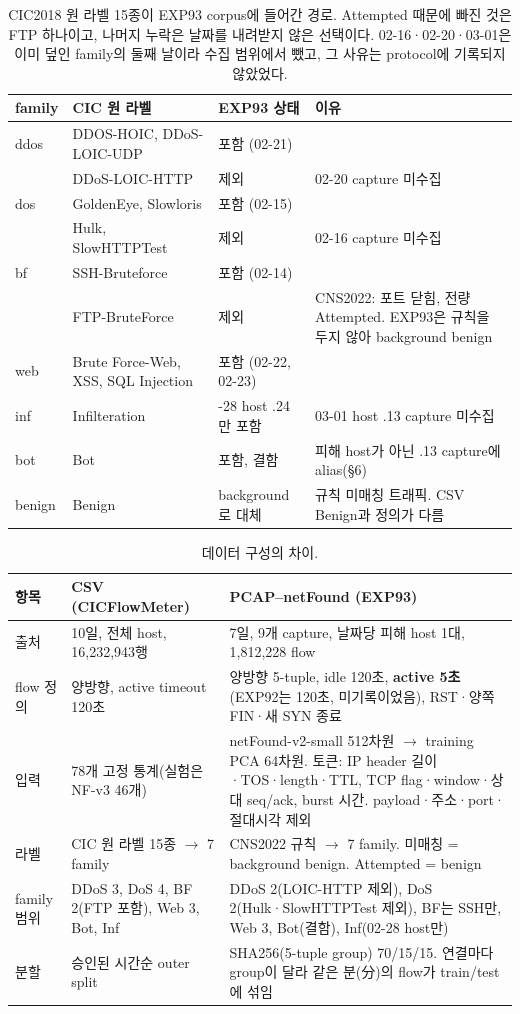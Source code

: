 \begin{table}[H]
\centering\small
\caption{CIC2018 원 라벨 15종이 EXP93 corpus에 들어간 경로. Attempted 때문에 빠진 것은 FTP 하나이고, 나머지 누락은 날짜를 내려받지 않은 선택이다. 02-16·02-20·03-01은 이미 덮인 family의 둘째 날이라 수집 범위에서 뺐고, 그 사유는 protocol에 기록되지 않았었다.}
\begin{tabularx}{\linewidth}{l>{\raggedright\arraybackslash}p{.3\linewidth}>{\raggedright\arraybackslash}p{.22\linewidth}Y}
\toprule family & CIC 원 라벨 & EXP93 상태 & 이유\\\midrule
ddos & DDOS-HOIC, DDoS-LOIC-UDP & 포함 (02-21) & \\
     & DDoS-LOIC-HTTP & 제외 & 02-20 capture 미수집\\
dos  & GoldenEye, Slowloris & 포함 (02-15) & \\
     & Hulk, SlowHTTPTest & 제외 & 02-16 capture 미수집\\
bf   & SSH-Bruteforce & 포함 (02-14) & \\
     & FTP-BruteForce & 제외 & CNS2022: 포트 닫힘, 전량 Attempted. EXP93은 규칙을 두지 않아 background benign\\
web  & Brute Force-Web, XSS, SQL Injection & 포함 (02-22, 02-23) & \\
inf  & Infilteration & 02-28 host .24만 포함 & 03-01 host .13 capture 미수집\\
bot  & Bot & 포함, 결함 & 피해 host가 아닌 .13 capture에 alias(\S6)\\
benign & Benign & background로 대체 & 규칙 미매칭 트래픽. CSV Benign과 정의가 다름\\
\bottomrule
\end{tabularx}
\end{table}

\begin{table}[H]
\centering\small
\caption{데이터 구성의 차이.}
\begin{tabularx}{\linewidth}{p{.15\linewidth}YY}
\toprule 항목 & CSV (CICFlowMeter) & PCAP--netFound (EXP93)\\\midrule
출처 & 10일, 전체 host, 16,232,943행 & 7일, 9개 capture, 날짜당 피해 host 1대, 1,812,228 flow\\
flow 정의 & 양방향, active timeout 120초 & 양방향 5-tuple, idle 120초, \textbf{active 5초}(EXP92는 120초, 미기록이었음), RST·양쪽 FIN·새 SYN 종료\\
입력 & 78개 고정 통계(실험은 NF-v3 46개) & netFound-v2-small 512차원 $\to$ training PCA 64차원. 토큰: IP header 길이·TOS·length·TTL, TCP flag·window·상대 seq/ack, burst 시간. payload·주소·port·절대시각 제외\\
라벨 & CIC 원 라벨 15종 $\to$ 7 family & CNS2022 규칙 $\to$ 7 family. 미매칭 = background benign. Attempted = benign\\
family 범위 & DDoS 3, DoS 4, BF 2(FTP 포함), Web 3, Bot, Inf & DDoS 2(LOIC-HTTP 제외), DoS 2(Hulk·SlowHTTPTest 제외), BF는 SSH만, Web 3, Bot(결함), Inf(02-28 host만)\\
분할 & 승인된 시간순 outer split & SHA256(5-tuple group) 70/15/15. 연결마다 group이 달라 같은 분(分)의 flow가 train/test에 섞임\\
\bottomrule
\end{tabularx}
\end{table}

